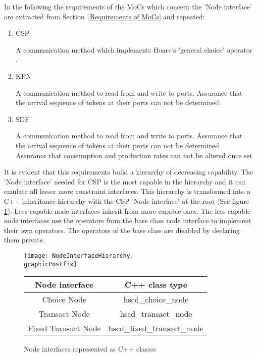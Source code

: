 In the following the requirements of the MoCs which concern the 'Node interface' are
extracted from Section~\ref{Requirements of MoCs} and repeated:

\begin{enumerate}
\item CSP

A communication method which implements Hoare's 'general choice' operator \cite{csphoare:1985}.

\item KPN

A communication method to read from and write to ports.
Assurance that the arrival sequence of tokens at
their ports can not be determined.

\item SDF

A communication method to read from and write to ports.
Assurance that the arrival sequence of tokens at
their ports can not be determined.
Assurance that consumption and production rates can not
be altered once set

\end{enumerate}

It is evident that this requirements build a hierarchy of decreasing
capability. The 'Node interface' needed for CSP is the most capable
in the hierarchy and it can emulate all lesser more constraint interfaces.
This hierarchy is transformed into a C++ inheritance hierarchy with the
CSP 'Node interface' at the root (See figure \ref{node-interface-c++}).
Less capable node interfaces inherit from more capable ones. The
less capable node interfaces use the operators from the base class node
interface to implement their own operators. The operators of the
base class are disabled by declaring them private.

\begin{figure}
\centering
\texttt{[image: NodeInterfaceHierarchy.\\graphicPostfix]}\\
\begin{tabular}{|c|c|}
\hline
 Node interface & C++ class type \\
\hline \hline
 Choice Node          & hscd\_choice\_node \\
 Transact Node        & hscd\_transact\_node \\
 Fixed Transact Node  & hscd\_fixed\_transact\_node \\
\hline
\end{tabular}
\caption{\label{node-interface-c++}Node interfaces represented as C++ classes}
\end{figure}

